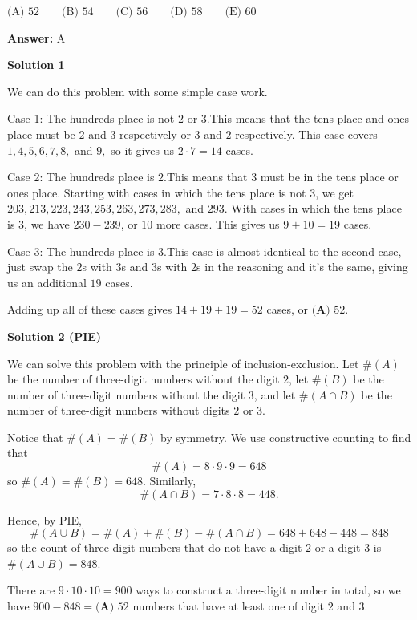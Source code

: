 \begin{enumerate}
 $\text{(A) }52 \qquad \text{(B) }54  \qquad \text{(C) }56 \qquad \text{(D) }58 \qquad \text{(E) }60$

 \textbf{Answer: }A



\textbf{Solution 1}

We can do this problem with some simple case work.

 Case 1: The hundreds place is not $2$ or $3.$This means that the tens place and ones place must be $2$ and $3$ respectively or $3$ and $2$ respectively. This case covers $1, 4, 5, 6, 7, 8,$ and $9,$ so it gives us $2 \cdot 7 = 14$ cases.

 Case 2: The hundreds place is $2.$This means that $3$ must be in the tens place or ones place. Starting with cases in which the tens place is not $3$, we get $203, 213, 223, 243, 253, 263, 273, 283,$ and $293.$  With cases in which the tens place is $3$, we have $230-239$, or $10$ more cases. This gives us $9 + 10=19$ cases.

 Case 3: The hundreds place is $3.$This case is almost identical to the second case, just swap the $2$s with $3$s and $3$s with $2$s in the reasoning and it's the same, giving us an additional $19$ cases.

 Adding up all of these cases gives $14+19+19=52$ cases, or $\boxed{\textbf{(A) }52}.$




\textbf{Solution 2 (PIE)}

We can solve this problem with the principle of inclusion-exclusion. Let $\#(A)$ be the number of three-digit numbers without the digit $2$, let $\#(B)$ be the number of three-digit numbers without the digit $3$, and let $\#(A \cap B)$ be the number of three-digit numbers without digits $2$ or $3$.

 Notice that $\#(A)=\#(B)$ by symmetry. We use constructive counting to find that 
 \[\#(A) = 8 \cdot 9 \cdot 9 = 648\] so $\#(A) = \#(B) = 648$. Similarly, 
 \[\#(A \cap B) = 7 \cdot 8 \cdot 8 = 448.\]

 Hence, by PIE, 
 \[\#(A \cup B) = \#(A) + \#(B) - \#(A \cap B) = 648 + 648 - 448 = 848\] so the count of three-digit numbers that do not have a digit $2$ or a digit $3$ is $\#(A \cup B) = 848$.

 There are $9 \cdot 10 \cdot 10 = 900$ ways to construct a three-digit number in total, so we have $900 - 848 = \boxed{\textbf{(A) }52}$ numbers that have at least one of digit $2$ and $3$.

 



\end{enumerate}
